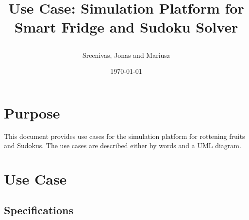 \documentclass[a4paper,12pt]{article}
\begin{document}



\title{\begin{Huge}
\textbf{Use Case: Simulation Platform for Smart Fridge and Sudoku Solver}
\end{Huge}}
\author{\begin{Large}
Sreenivas, Jonas and Mariusz
\end{Large}}
\date{\today}
\maketitle
\thispagestyle{empty}

\newpage

\section{Purpose}
This document provides use cases for the simulation platform for rottening fruits and Sudokus. The use cases are described either by words and a UML diagram.

\section{Use Case}
\subsection{Specifications}
\end{document}
